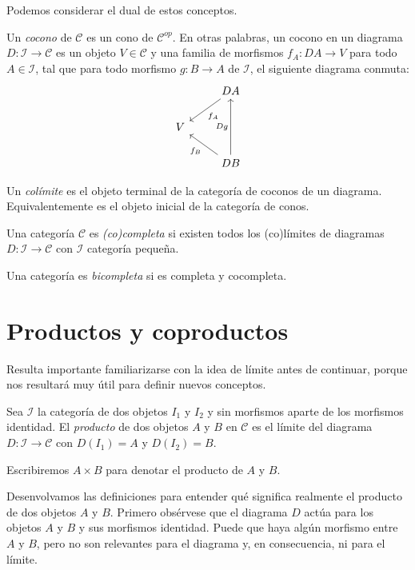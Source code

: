 \documentclass[12pt, twoside]{book}
\newcommand{\newterm}[1]{\index{#1}\emph{#1}}
\newcommand{\cat}{{\mathcal{C}}}
\begin{document}
Podemos considerar el dual de estos conceptos.

\begin{definition}
Un \newterm{cocono} de $\cat$ es un cono de $\cat^{op}$.
En otras palabras, un cocono en un diagrama $D \colon \mathcal{I} \to \cat$ es un objeto $V \in \cat$ y una familia de morfismos $f_A \colon D A \to V$ para todo $A \in \mathcal{I}$, tal que para todo morfismo $g \colon B \to A$ de $\mathcal{I}$, el siguiente diagrama conmuta:
\[ \begin{tikzcd}
 & D A \arrow[dl,"f_A"]\\
V\\
 & D B \arrow[ul,"f_B"] \arrow[uu,"D g"]
\end{tikzcd} \]
\end{definition}

\begin{definition}
Un \newterm{colímite} es el objeto terminal de la categoría de coconos de un diagrama. Equivalentemente es el objeto inicial de la categoría de conos.
\end{definition}

\begin{definition}
Una categoría $\cat$ es \emph{(co)completa} si existen todos los (co)límites de diagramas $D \colon \mathcal{I} \to \cat$ con $\mathcal{I}$ categoría pequeña.

Una categoría es \emph{bicompleta} si es completa y cocompleta.
\end{definition}

\section{Productos y coproductos}

Resulta importante familiarizarse con la idea de límite antes de continuar, porque nos resultará muy útil para definir nuevos conceptos.

\begin{definition}
Sea $\mathcal{I}$ la categoría de dos objetos $I_1$ y $I_2$ y sin morfismos aparte de los morfismos identidad. El \newterm{producto} de dos objetos $A$ y $B$ en $\cat$ es el límite del diagrama $D \colon \mathcal{I} \to \cat$ con $D(I_1) = A$ y $D(I_2) = B$.

Escribiremos $A \times B$ para denotar el producto de $A$ y $B$.
\end{definition}

Desenvolvamos las definiciones para entender qué significa realmente el producto de dos objetos $A$ y $B$.
Primero obsérvese que el diagrama $D$ actúa para  los objetos $A$ y $B$ y sus morfismos identidad.
Puede que haya algún morfismo entre $A$ y $B$, pero no son relevantes para el diagrama y, en consecuencia, ni para el límite.
\end{document}
